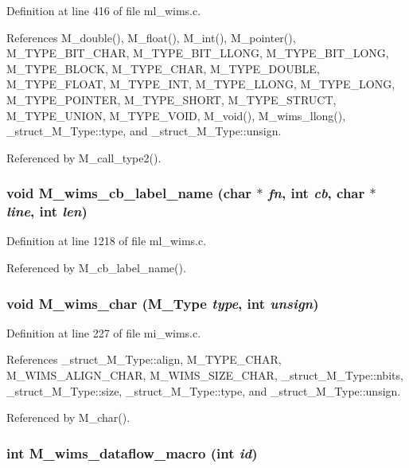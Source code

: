 Definition at line 416 of file ml\_\-wims.c.

References M\_\-double(), M\_\-float(), M\_\-int(), M\_\-pointer(), M\_\-TYPE\_\-BIT\_\-CHAR, M\_\-TYPE\_\-BIT\_\-LLONG, M\_\-TYPE\_\-BIT\_\-LONG, M\_\-TYPE\_\-BLOCK, M\_\-TYPE\_\-CHAR, M\_\-TYPE\_\-DOUBLE, M\_\-TYPE\_\-FLOAT, M\_\-TYPE\_\-INT, M\_\-TYPE\_\-LLONG, M\_\-TYPE\_\-LONG, M\_\-TYPE\_\-POINTER, M\_\-TYPE\_\-SHORT, M\_\-TYPE\_\-STRUCT, M\_\-TYPE\_\-UNION, M\_\-TYPE\_\-VOID, M\_\-void(), M\_\-wims\_\-llong(), \_\-struct\_\-M\_\-Type::type, and \_\-struct\_\-M\_\-Type::unsign.

Referenced by M\_\-call\_\-type2().
\subsubsection{\setlength{\rightskip}{0pt plus 5cm}void M\_\-wims\_\-cb\_\-label\_\-name (char $\ast$ {\em fn}, int {\em cb}, char $\ast$ {\em line}, int {\em len})}\label{m__wims_8h_9ef233f7ce6f06e330494ac6b22158cb}




Definition at line 1218 of file ml\_\-wims.c.

Referenced by M\_\-cb\_\-label\_\-name().
\subsubsection{\setlength{\rightskip}{0pt plus 5cm}void M\_\-wims\_\-char (\bf{M\_\-Type} {\em type}, int {\em unsign})}\label{m__wims_8h_ff6a6f98e94463f48ee365e7fd441bd9}




Definition at line 227 of file mi\_\-wims.c.

References \_\-struct\_\-M\_\-Type::align, M\_\-TYPE\_\-CHAR, M\_\-WIMS\_\-ALIGN\_\-CHAR, M\_\-WIMS\_\-SIZE\_\-CHAR, \_\-struct\_\-M\_\-Type::nbits, \_\-struct\_\-M\_\-Type::size, \_\-struct\_\-M\_\-Type::type, and \_\-struct\_\-M\_\-Type::unsign.

Referenced by M\_\-char().
\subsubsection{\setlength{\rightskip}{0pt plus 5cm}int M\_\-wims\_\-dataflow\_\-macro (int {\em id})}\label{m__wims_8h_dc534ee0f8dabac80d8acf791e23f00a}


